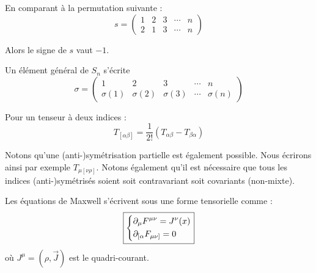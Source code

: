 En comparant à la permutation suivante :
\begin{equation*}
    s = 
    \begin{pmatrix}
        1 & 2 & 3 & \cdots & n \\
        2 & 1 & 3 & \cdots & n 
    \end{pmatrix}
\end{equation*}

Alors le signe de $s$ vaut $-1$.

Un élément général de $S_n$ s'écrite 
\begin{equation*}
\sigma = \begin{pmatrix}
1 & 2 & 3 & \cdots & n \\
\sigma(1) & \sigma(2) & \sigma(3) & \cdots & \sigma(n) 
\end{pmatrix}
\end{equation*}
\begin{exmp}
    Pour un tenseur à deux indices : 
    \begin{equation*}
        T_{[\alpha \beta]} = \frac{1}{2!}\left(T_{\alpha\beta} - T_{ \beta \alpha}\right)
    \end{equation*}
\end{exmp}
Notons qu'une (anti-)symétrisation partielle est également possible. Nous écrirons ainsi par exemple $T_{\mu [\nu \rho]}$. Notons également qu'il est nécessaire que tous les indices (anti-)symétrisés soient soit contravariant soit covariants (non-mixte).
\begin{theoremframe}
    \begin{propri}
        Les équations de Maxwell s'écrivent sous une forme tensorielle comme :
        \begin{align}
            \boxed{\begin{dcases}
                \partial_{\mu} F^{\mu \nu} = J^{\nu}(x) \\
                \partial_{[{\alpha}}F_{\mu \nu]} = 0
            \end{dcases}}
        \end{align}
        où $J^{\mu} = (\rho, \Vec{J})$ est le quadri-courant.
    \end{propri}
\end{theoremframe}

